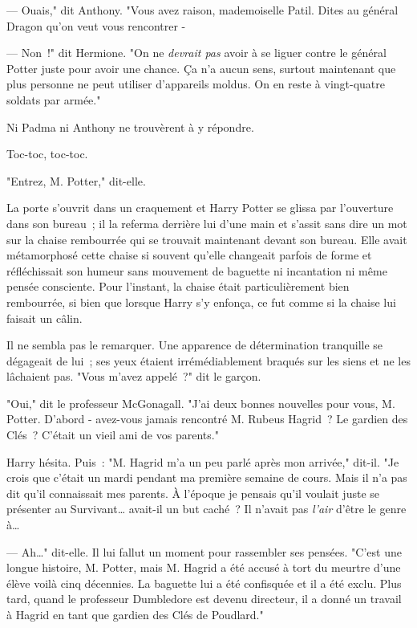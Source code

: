 --- Ouais," dit Anthony. "Vous avez raison, mademoiselle Patil. Dites au général Dragon qu'on veut vous rencontrer -

--- Non~!" dit Hermione. "On ne \emph{devrait pas} avoir à se liguer contre le général Potter juste pour avoir une chance. Ça n'a aucun sens, surtout maintenant que plus personne ne peut utiliser d'appareils moldus. On en reste à vingt-quatre soldats par armée."

Ni Padma ni Anthony ne trouvèrent à y répondre.

\later

Toc-toc, toc-toc.

"Entrez, M. Potter," dit-elle.

La porte s'ouvrit dans un craquement et Harry Potter se glissa par l'ouverture dans son bureau~; il la referma derrière lui d'une main et s'assit sans dire un mot sur la chaise rembourrée qui se trouvait maintenant devant son bureau. Elle avait métamorphosé cette chaise si souvent qu'elle changeait parfois de forme et réfléchissait son humeur sans mouvement de baguette ni incantation ni même pensée consciente. Pour l'instant, la chaise était particulièrement bien rembourrée, si bien que lorsque Harry s'y enfonça, ce fut comme si la chaise lui faisait un câlin.

Il ne sembla pas le remarquer. Une apparence de détermination tranquille se dégageait de lui~; ses yeux étaient irrémédiablement braqués sur les siens et ne les lâchaient pas. "Vous m'avez appelé~?" dit le garçon.

"Oui," dit le professeur McGonagall. "J'ai deux bonnes nouvelles pour vous, M. Potter. D'abord - avez-vous jamais rencontré M. Rubeus Hagrid~? Le gardien des Clés~? C'était un vieil ami de vos parents."

Harry hésita. Puis~: "M. Hagrid m'a un peu parlé après mon arrivée," dit-il. "Je crois que c'était un mardi pendant ma première semaine de cours. Mais il n'a pas dit qu'il connaissait mes parents. À l'époque je pensais qu'il voulait juste se présenter au Survivant… avait-il un but caché~? Il n'avait pas \emph{l'air} d'être le genre à…

--- Ah…" dit-elle. Il lui fallut un moment pour rassembler ses pensées. "C'est une longue histoire, M. Potter, mais M. Hagrid a été accusé à tort du meurtre d'une élève voilà cinq décennies. La baguette lui a été confisquée et il a été exclu. Plus tard, quand le professeur Dumbledore est devenu directeur, il a donné un travail à Hagrid en tant que gardien des Clés de Poudlard."


